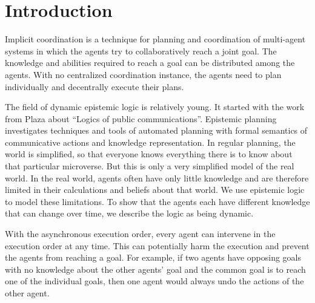\chapter{Introduction}\label{chap:introduction}





Implicit coordination is a technique for planning and coordination of multi-agent systems in which the agents try to collaboratively reach a joint goal. The knowledge and abilities required to reach a goal can be distributed among the agents. With no centralized coordination instance, the agents need to plan individually and decentrally execute their plans.


The field of dynamic epistemic logic is relatively young. It started with the work from Plaza \cite{plaza1989logics} about ``Logics of public communications''.
Epistemic planning investigates techniques and tools of automated planning with formal semantics of communicative actions and knowledge representation.
In regular planning, the world is simplified, so that everyone knows everything there is to know about that particular microverse. But this is only a very simplified model of the real world. In the real world, agents often have only little knowledge and are therefore limited in their calculations and beliefs about that world. We use epistemic logic to model these limitations. To show that the agents each have different knowledge that can change over time, we describe the logic as being dynamic.

With the asynchronous execution order, every agent can intervene in the execution order at any time. This can potentially harm the execution and prevent the agents from reaching a goal. For example, if two agents have opposing goals with no knowledge about the other agents' goal and the common goal is to reach one of the individual goals, then one agent would always undo the actions of the other agent.

